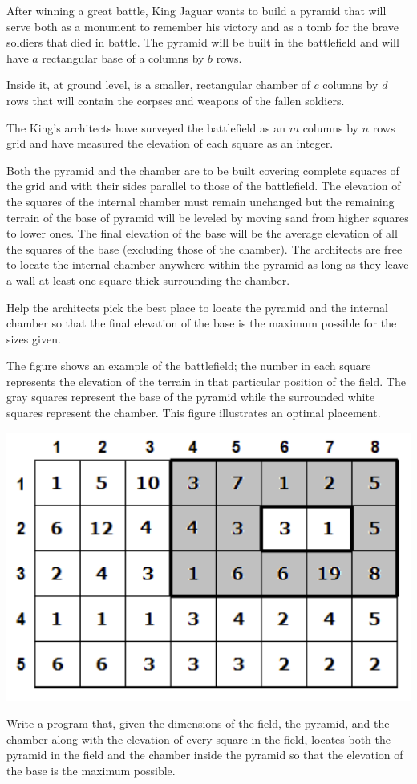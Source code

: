 After winning a great battle, King Jaguar wants to build a pyramid that will serve both as a monument to remember his victory and as a tomb for the brave soldiers that died in battle. The pyramid will be built in the battlefield and will have $a$ rectangular base of a columns by $b$ rows. 

Inside it, at ground level, is a smaller, rectangular chamber of $c$ columns by $d$ rows that will contain the corpses and weapons of the fallen soldiers.

The King's architects have surveyed the battlefield as an $m$ columns by $n$ rows grid and have measured the elevation of each square as an integer.

Both the pyramid and the chamber are to be built covering complete squares of the grid and with their sides parallel to those of the battlefield. The elevation of the squares of the internal chamber must remain unchanged but the remaining terrain of the base of pyramid will be leveled by moving sand from higher squares to lower ones. The final elevation of the base will be the average elevation of all the squares of the base (excluding those of the chamber). The architects are free to locate the internal chamber anywhere within the pyramid as long as they leave a wall at least one
square thick surrounding the chamber.

Help the architects pick the best place to locate the pyramid and the internal chamber so that the final elevation of the base is the maximum possible for the sizes given.

The figure shows an example of the battlefield; the number in each square represents the elevation of the terrain in that particular position of the field. The gray squares represent the base of the pyramid while the surrounded white squares represent the chamber. This figure illustrates an optimal placement.

\includegraphics{piramida.png}

Write a program that, given the dimensions of the field, the pyramid, and the chamber along with the elevation of every square in the field, locates both the pyramid in the field and the chamber inside the pyramid so that the elevation of the base is the maximum possible.


